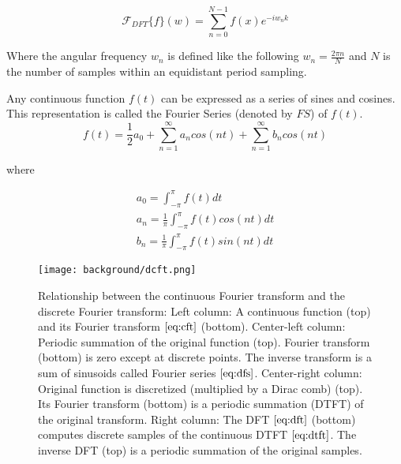 \begin{equation}
  \mathcal{F}_{DFT}\{f\}(w) = \sum_{n=0}^{N-1} f(x) e^{-iw_{n}k}
  \label{eq:dft}
\end{equation}

Where the angular frequency $w_n$ is defined like the following $w_n = \frac{2\pi n}{N}$ and $N$ is the number of samples within an equidistant period sampling.

Any continuous function $f(t)$ can be expressed as a series of sines and cosines. This representation is called the Fourier Series (denoted by $FS$) of $f(t)$.
\begin{equation}
  f(t) = \frac{1}{2}a_0 + \sum_{n=1}^{\infty} a_n cos(nt) + \sum_{n=1}^{\infty} b_n cos(nt)
  \label{eq:dfs}
\end{equation}

where

\begin{align}
    a_0 = \int_{-\pi}^{\pi} f(t) dt \nonumber \\
    a_n = \frac{1}{\pi}\int_{-\pi}^{\pi} f(t) cos(nt) dt \nonumber \\
    b_n = \frac{1}{\pi}\int_{-\pi}^{\pi} f(t) sin(nt) dt
\end{align}

\begin{figure}[H]
  \centering
  \texttt{[image: background/dcft.png]}
  \caption{Relationship between the continuous Fourier transform and the discrete Fourier transform: Left column: A continuous function (top) and its Fourier transform $\ref{eq:cft}$ (bottom). Center-left column: Periodic summation of the original function (top). Fourier transform (bottom) is zero except at discrete points. The inverse transform is a sum of sinusoids called Fourier series $\ref{eq:dfs}$. Center-right column: Original function is discretized (multiplied by a Dirac comb) (top). Its Fourier transform (bottom) is a periodic summation (DTFT) of the original transform. Right column: The DFT $\ref{eq:dft}$ (bottom) computes discrete samples of the continuous DTFT $\ref{eq:dtft}$. The inverse DFT (top) is a periodic summation of the original samples.}
\label{fig:contdiscft}
\end{figure}

